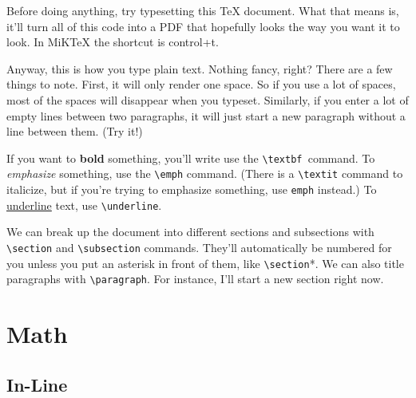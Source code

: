 \documentclass[12pt]{article}
\begin{document}
\maketitle %


Before doing anything, try typesetting this TeX document. What that means is, it'll turn all of this code into a PDF that hopefully looks the way you want it to look. In MiKTeX the shortcut is control+t. 

Anyway, this is how you type plain text. Nothing fancy, right? There are a few things to note. First, it will only render one space. So if you use     a lot of spaces, most of the spaces will disappear when you typeset. Similarly, if you enter a lot of empty lines between two paragraphs, it will just start a new paragraph without a line between them. (Try it!)

If you want to \textbf{bold} something, you'll write use the \verb|\textbf |command. To \emph{emphasize} something, use the \verb|\emph| command. (There is a \verb|\textit| command to italicize, but if you're trying to emphasize something, use \verb|emph| instead.) To \underline{underline} text, use \verb|\underline|. 

We can break up the document into different sections and subsections with \verb|\section| and \verb|\subsection| commands. They'll automatically be numbered for you unless you put an asterisk in front of them, like \verb|\section|*. We can also title paragraphs with \verb|\paragraph|. For instance, I'll start a new section right now.




\section{Math}


\subsection{In-Line}
\end{document}
